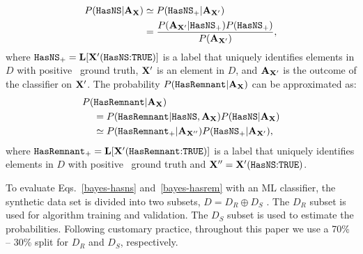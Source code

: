 \begin{align}
\label{bayes-hasns}
P({{\tt HasNS}}|{\bf A}_{\bf X})&\simeq P({{\tt HasNS}}_+|{\bf A}_{{\bf X}'}) \nonumber \\
&=\frac{P({\bf A}_{{\bf X}'}|{{\tt HasNS}}_+)P({{\tt HasNS}}_+)}{P({\bf A}_{{\bf X}'})},
\end{align}
%
where ${{\tt HasNS}}_+={\bf L}[{\bf X}'(\hbox{{{\tt HasNS}}:{{\tt TRUE}}})]$ is a label that uniquely identifies elements in $D$ with positive \tocheck{(+)} \hasns\ ground truth, ${\bf X}'$ is an element in $D$, and ${\bf A}_{{\bf X}'}$ is the outcome of the classifier on ${\bf X}'$.  The probability $P({{\tt HasRemnant}}|{\bf A}_{\bf X})$ can be approximated as:
%
\begin{align}
\label{bayes-hasrem}
P(&{{\tt HasRemnant}}|{\bf A}_{\bf X}) \nonumber  \\
&=P({{\tt HasRemnant}}|{{\tt HasNS}}, {\bf A}_{\bf X})P({{\tt HasNS}}|{\bf A}_{\bf X}) \nonumber \\
&\simeq P({{\tt HasRemnant}}_+|{\bf A}_{{\bf X}''})P({{\tt HasNS}}_+|{\bf A}_{{\bf X}'}),
\end{align}
where ${{\tt HasRemnant}}_+={\bf L}[{\bf X}'(\hbox{{{\tt HasRemnant}}:{{\tt TRUE}}})]$ is a label that uniquely identifies elements in $D$ with positive \hasrem\ ground truth and ${\bf X}''= {\bf X}'(\hbox{{{\tt HasNS}}:{{\tt TRUE}}})$.

To evaluate Eqs.~\eqref{bayes-hasns} and~\eqref{bayes-hasrem} with an \ac{ML} classifier, the synthetic data set is divided into two subsets, $D=D_R\oplus D_S$ . The $D_R$ subset is used
for algorithm training and validation. The $D_S$ subset is used to estimate the probabilities. Following customary practice, throughout this paper we use a 70\% -- 30\% split for $D_R$
and $D_S$, respectively.

